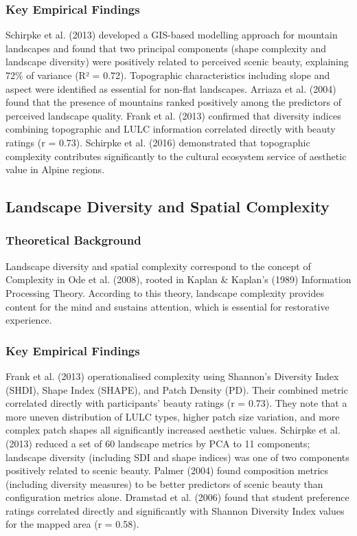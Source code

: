 \documentclass[hidelinks, 11pt]{article}
\begin{document}
\subsubsection{Key Empirical Findings}
Schirpke et al. (2013) developed a GIS-based modelling approach for mountain landscapes and found that two principal components (shape complexity and landscape diversity) were positively related to perceived scenic beauty, explaining 72\% of variance (R² = 0.72). Topographic characteristics including slope and aspect were identified as essential for non-flat landscapes.
Arriaza et al. (2004) found that the presence of mountains ranked positively among the predictors of perceived landscape quality.
Frank et al. (2013) confirmed that diversity indices combining topographic and LULC information correlated directly with beauty ratings (r = 0.73).
Schirpke et al. (2016) demonstrated that topographic complexity contributes significantly to the cultural ecosystem service of aesthetic value in Alpine regions.

\subsection{Landscape Diversity and Spatial Complexity}\label{sec:LDSC}
\subsubsection{Theoretical Background}
Landscape diversity and spatial complexity correspond to the concept of Complexity in Ode et al. (2008), rooted in Kaplan & Kaplan's (1989) Information Processing Theory. According to this theory, landscape complexity provides content for the mind and sustains attention, which is essential for restorative experience. 
\subsubsection{Key Empirical Findings}
Frank et al. (2013) operationalised complexity using Shannon's Diversity Index (SHDI), Shape Index (SHAPE), and Patch Density (PD). Their combined metric correlated directly with participants' beauty ratings (r = 0.73). They note that a more uneven distribution of LULC types, higher patch size variation, and more complex patch shapes all significantly increased aesthetic values.
Schirpke et al. (2013) reduced a set of 60 landscape metrics by PCA to 11 components; landscape diversity (including SDI and shape indices) was one of two components positively related to scenic beauty.
Palmer (2004) found composition metrics (including diversity measures) to be better predictors of scenic beauty than configuration metrics alone.
Dramstad et al. (2006) found that student preference ratings correlated directly and significantly with Shannon Diversity Index values for the mapped area (r = 0.58).
\end{document}
